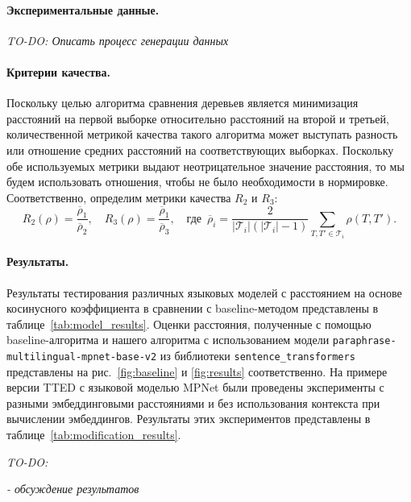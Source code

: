 \documentclass[12pt]{article}
\begin{document}
\paragraph{Экспериментальные данные.} \textit{TO-DO: Описать процесс генерации данных}

\paragraph{Критерии качества.} Поскольку целью алгоритма сравнения деревьев является минимизация расстояний на первой выборке относительно расстояний на второй и третьей, количественной метрикой качества такого алгоритма может выступать разность или отношение средних расстояний на соответствующих выборках. Поскольку обе используемых метрики выдают неотрицательное значение расстояния, то мы будем использовать отношения, чтобы не было необходимости в нормировке. Соответственно, определим метрики качества $R_2$ и $R_3$:
$$
R_2(\rho) = \frac{\overline{\rho}_1}{\overline{\rho}_2}, \quad R_3(\rho) = \frac{\overline{\rho}_1}{\overline{\rho}_3}, \quad \text{где } \, \overline{\rho}_i = \frac{2}{|\mathcal{T}_i|(|\mathcal{T}_i|-1)}\sum\limits_{T, T'\in  \mathcal{T}_i} \rho(T, T').
$$

\paragraph{Результаты.} Результаты тестирования различных языковых моделей с расстоянием на основе косинусного коэффициента в сравнении с baseline-методом представлены в таблице~\ref{tab:model_results}. Оценки расстояния, полученные с помощью baseline-алгоритма и нашего алгоритма с использованием модели \texttt{paraphrase-multilingual-mpnet-base-v2} из библиотеки \texttt{sentence\_transformers} представлены на рис.~\ref{fig:baseline} и \ref{fig:results} соответственно. На примере версии TTED с языковой моделью MPNet были проведены эксперименты с разными эмбеддинговыми расстояниями и без использования контекста при вычислении эмбеддингов. Результаты этих экспериментов представлены в таблице~\ref{tab:modification_results}. 



\textit{TO-DO: }

\textit{- обсуждение результатов}
\end{document}
